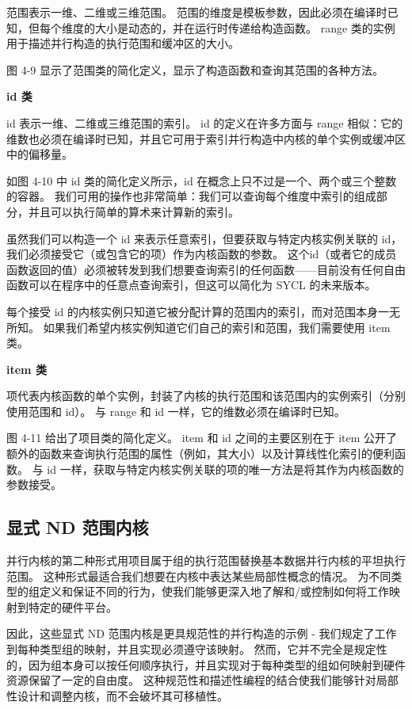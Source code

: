 范围表示一维、二维或三维范围。 范围的维度是模板参数，因此必须在编译时已知，但每个维度的大小是动态的，并在运行时传递给构造函数。 range 类的实例用于描述并行构造的执行范围和缓冲区的大小。

图 4-9 显示了范围类的简化定义，显示了构造函数和查询其范围的各种方法。

\textbf{id 类}

id 表示一维、二维或三维范围的索引。 id 的定义在许多方面与 range 相似：它的维数也必须在编译时已知，并且它可用于索引并行构造中内核的单个实例或缓冲区中的偏移量。

如图 4-10 中 id 类的简化定义所示，id 在概念上只不过是一个、两个或三个整数的容器。 我们可用的操作也非常简单：我们可以查询每个维度中索引的组成部分，并且可以执行简单的算术来计算新的索引。

虽然我们可以构造一个 id 来表示任意索引，但要获取与特定内核实例关联的 id，我们必须接受它（或包含它的项）作为内核函数的参数。 这个id（或者它的成员函数返回的值）必须被转发到我们想要查询索引的任何函数——目前没有任何自由函数可以在程序中的任意点查询索引，但这可以简化为 SYCL 的未来版本。

每个接受 id 的内核实例只知道它被分配计算的范围内的索引，而对范围本身一无所知。 如果我们希望内核实例知道它们自己的索引和范围，我们需要使用 item 类。

\textbf{item 类}

项代表内核函数的单个实例，封装了内核的执行范围和该范围内的实例索引（分别使用范围和 id）。 与 range 和 id 一样，它的维数必须在编译时已知。

图 4-11 给出了项目类的简化定义。 item 和 id 之间的主要区别在于 item 公开了额外的函数来查询执行范围的属性（例如，其大小）以及计算线性化索引的便利函数。 与 id 一样，获取与特定内核实例关联的项的唯一方法是将其作为内核函数的参数接受。

\subsection{显式 ND 范围内核}
并行内核的第二种形式用项目属于组的执行范围替换基本数据并行内核的平坦执行范围。 这种形式最适合我们想要在内核中表达某些局部性概念的情况。 为不同类型的组定义和保证不同的行为，使我们能够更深入地了解和/或控制如何将工作映射到特定的硬件平台。

因此，这些显式 ND 范围内核是更具规范性的并行构造的示例 - 我们规定了工作到每种类型组的映射，并且实现必须遵守该映射。 然而，它并不完全是规定性的，因为组本身可以按任何顺序执行，并且实现对于每种类型的组如何映射到硬件资源保留了一定的自由度。 这种规范性和描述性编程的结合使我们能够针对局部性设计和调整内核，而不会破坏其可移植性。

